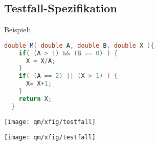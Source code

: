 \subsection{Testfall-Spezifikation}
Beispiel:
\begin{lstlisting}[language=java]
  double M( double A, double B, double X ){
    if( (A > 1) && (B == 0) ) {
      X = X/A;
    }
    if( (A == 2) || (X > 1) ) {
      X= X+1;
    }
    return X;
  }
\end{lstlisting}
\ifslides
\begin{center}
\texttt{[image: qm/xfig/testfall]}
\end{center}
\else
\texttt{[image: qm/xfig/testfall]}
\fi
\newpage
